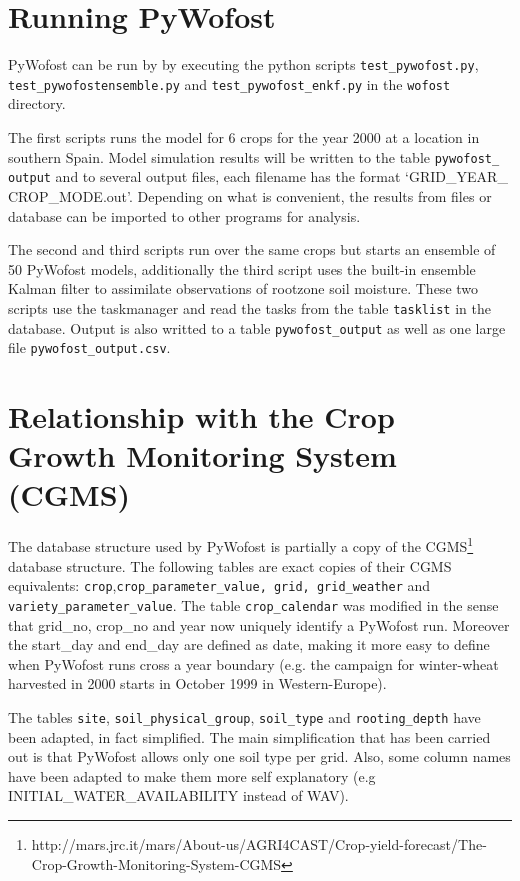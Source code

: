 \documentclass[12pt]{article}
\begin{document}
\section{Running PyWofost}

PyWofost can be run by by executing the python scripts \texttt{test\_pywofost.py}, \\ \texttt{test\_pywofostensemble.py} and \texttt{test\_pywofost\_enkf.py} in the \texttt{wofost} directory. 

The first scripts runs the model for 6 crops for the year 2000 at a location in southern Spain. Model simulation results will be written to the table \texttt{pywofost\_} \texttt{output} and to several output files, each filename has the format `GRID\_YEAR\_ CROP\_MODE.out'. Depending on what is convenient, the results from files or database can be imported to other programs for analysis.

The second and third scripts run over the same crops but starts an ensemble of 50 PyWofost models, additionally the third script uses the built-in ensemble Kalman filter to assimilate observations of rootzone soil moisture. These two scripts use the taskmanager and read the tasks from the table \texttt{tasklist} in the database. Output is also writted to a table \texttt{pywofost\_output} as well as one large file \texttt{pywofost\_output.csv}.

\section{Relationship with the Crop Growth Monitoring System (CGMS)}

The database structure used by PyWofost is partially a copy of the CGMS\footnote{http://mars.jrc.it/mars/About-us/AGRI4CAST/Crop-yield-forecast/The-Crop-Growth-Monitoring-System-CGMS} database structure. The following tables are exact copies of their CGMS equivalents: \texttt{crop},\linebreak \texttt{crop\_parameter\_value, grid, grid\_weather} and \texttt{variety\_parameter\_}\linebreak \texttt{value}. The table \texttt{crop\_calendar} was modified in the sense that grid\_no, crop\_no and year now uniquely identify a PyWofost run. Moreover the start\_day and end\_day are defined as date, making it more easy to define when PyWofost runs cross a year boundary (e.g. the campaign for winter-wheat harvested in 2000 starts in October 1999 in Western-Europe).

The tables \texttt{site}, \texttt{soil\_physical\_group}, \texttt{soil\_type} and \texttt{rooting\_depth} have been adapted, in fact simplified. The main simplification that has been carried out is that PyWofost allows only one soil type per grid. Also, some column names have been adapted to make them more self explanatory (e.g INITIAL\_WATER\_AVAI\-LABILITY instead of WAV).
\end{document}
